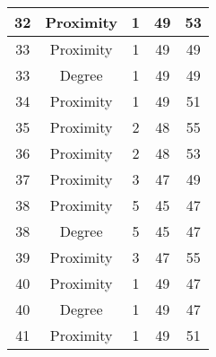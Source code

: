 \documentclass[results.tex]{subfiles}
\begin{document}
\begin{center}
\begin{tabular}{| c || c | c | c | c |}
            \hline
            32                      & Proximity                    & 1                      & 49                      & 53                   \\
            \hline
            33                      & Proximity                    & 1                      & 49                      & 49                   \\
            \hline
            33                      & Degree                       & 1                      & 49                      & 49                   \\
            \hline
            34                      & Proximity                    & 1                      & 49                      & 51                   \\
            \hline
            35                      & Proximity                    & 2                      & 48                      & 55                   \\
            \hline
            36                      & Proximity                    & 2                      & 48                      & 53                   \\
            \hline
            37                      & Proximity                    & 3                      & 47                      & 49                   \\
            \hline
            38                      & Proximity                    & 5                      & 45                      & 47                   \\
            \hline
            38                      & Degree                       & 5                      & 45                      & 47                   \\
            \hline
            39                      & Proximity                    & 3                      & 47                      & 55                   \\
            \hline
            40                      & Proximity                    & 1                      & 49                      & 47                   \\
            \hline
            40                      & Degree                       & 1                      & 49                      & 47                   \\
            \hline
            41                      & Proximity                    & 1                      & 49                      & 51                   \\

\end{tabular}
\end{center}
\end{document}
